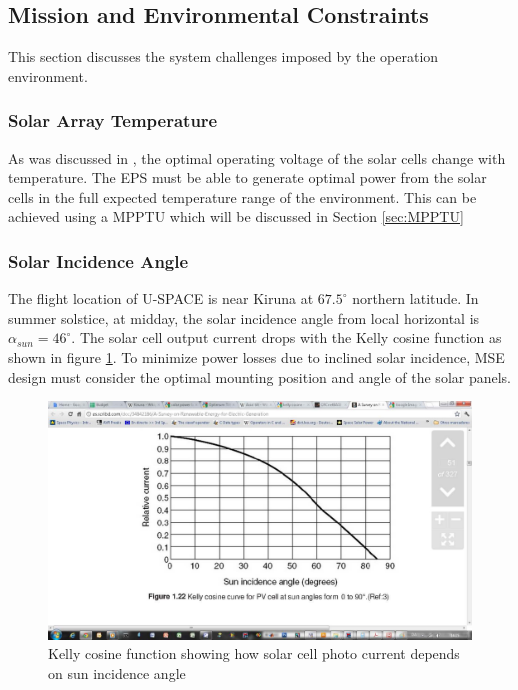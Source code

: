 \subsection{Mission and Environmental Constraints}
\label{subsec:environmental_requirements}
This section discusses the system challenges imposed by the operation environment.

\subsubsection*{Solar Array Temperature}
As was discussed in \cite{PDR}, the optimal operating voltage of the solar cells change with temperature. The \ac{EPS} must be able to generate optimal power from the solar cells in the full expected temperature range of the environment. This can be achieved using a \ac{MPPTU} which will be discussed in Section \ref{sec:MPPTU}

\subsubsection*{Solar Incidence Angle}
The flight location of U-SPACE is near Kiruna at $67.5^{\circ}$ northern latitude. In summer solstice, at midday, the solar incidence angle from local horizontal is $\alpha_{sun}=46^{\circ}$\cite[eq. 1]{PDR}. The solar cell output current drops with the Kelly cosine function as shown in figure \ref{fig:KellyCosine}. To minimize power losses due to inclined solar incidence, \ac{MSE} design must consider the optimal mounting position and angle of the solar panels.
%
\begin{figure}[H]
\centering
\includegraphics[scale=0.4]{figures/fig_KellyCosine}
\caption{Kelly cosine function showing how solar cell photo current depends on sun incidence angle}
\label{fig:KellyCosine}
\end{figure}
%
